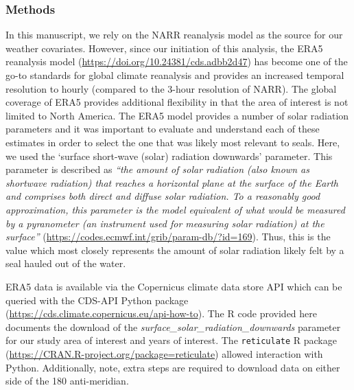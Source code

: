 \documentclass[fleqn,10pt,lineno]{wlpeerj} %
\begin{document}
\hypertarget{methods-1}{%
\subsubsection{Methods}\label{methods-1}}

In this manuscript, we rely on the NARR reanalysis model as the source for our
weather covariates. However, since our initiation of this analysis, the ERA5
reanalysis model (\url{https://doi.org/10.24381/cds.adbb2d47}) has become one of the
go-to standards for global climate reanalysis and provides an increased temporal
resolution to hourly (compared to the 3-hour resolution of NARR). The global
coverage of ERA5 provides additional flexibility in that the area of interest is
not limited to North America. The ERA5 model provides a number of solar
radiation parameters and it was important to evaluate and understand each of
these estimates in order to select the one that was likely most relevant to
seals. Here, we used the `surface short-wave (solar) radiation downwards'
parameter. This
parameter is described as \emph{``the amount of solar radiation (also known as shortwave radiation)
that reaches a horizontal plane at the surface of the Earth and comprises both
direct and diffuse solar radiation. To a reasonably good approximation, this
parameter is the model equivalent of what would be measured by a pyranometer (an
instrument used for measuring solar radiation) at the surface''}
(\url{https://codes.ecmwf.int/grib/param-db/?id=169}). Thus, this is the
value which most closely represents the amount of solar radiation likely
felt by a seal hauled out of the water.

ERA5 data is available via the Copernicus climate data store API which can be
queried with the CDS-API Python package
(\url{https://cds.climate.copernicus.eu/api-how-to}). The R code provided here
documents the download of the \emph{surface\_solar\_radiation\_downwards} parameter for
our study area of interest and years of interest. The \texttt{reticulate} R package
(\url{https://CRAN.R-project.org/package=reticulate}) allowed interaction with Python.
Additionally, note, extra steps are required to download data on either side
of the 180 anti-meridian.
\end{document}
